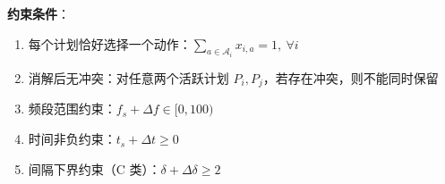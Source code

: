 \textbf{约束条件}：
\begin{enumerate}
    \item 每个计划恰好选择一个动作：$\sum_{a \in \mathcal{A}_i} x_{i,a} = 1,\ \forall i$
    \item 消解后无冲突：对任意两个活跃计划 $P_i, P_j$，若存在冲突，则不能同时保留
    \item 频段范围约束：$f_s + \Delta f \in [0, 100)$
    \item 时间非负约束：$t_s + \Delta t \geq 0$
    \item 间隔下界约束（C 类）：$\delta + \Delta \delta \geq 2$
\end{enumerate}
